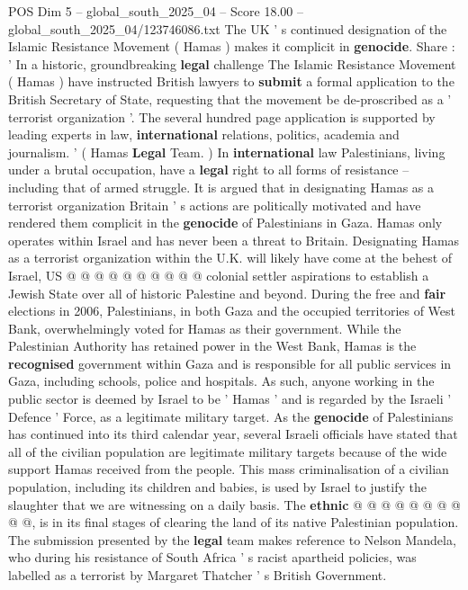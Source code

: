 \begin{textsample}{POS Dim 5 – global\_south\_2025\_04 – Score 18.00 – global\_south\_2025\_04/123746086.txt}  \label{ex:f5_pos_083}
The UK ' s continued designation of the Islamic Resistance Movement ( Hamas ) makes it complicit in \textbf{genocide}.
Share : ' In a historic, groundbreaking \textbf{legal} challenge The Islamic Resistance Movement ( Hamas ) have instructed British lawyers to \textbf{submit} a formal application to the British Secretary of State, requesting that the movement be de-proscribed as a ' terrorist organization '.
The several hundred page application is supported by leading experts in law, \textbf{international} relations, politics, academia and journalism. ' ( Hamas \textbf{Legal} Team. ) In \textbf{international} law Palestinians, living under a brutal occupation, have a \textbf{legal} right to all forms of resistance -- including that of armed struggle.
It is argued that in designating Hamas as a terrorist organization Britain ' s actions are politically motivated and have rendered them complicit in the \textbf{genocide} of Palestinians in Gaza.
Hamas only operates within Israel and has never been a threat to Britain.
Designating Hamas as a terrorist organization within the U.K. will likely have come at the behest of Israel, US @ @ @ @ @ @ @ @ @ @ colonial settler aspirations to establish a Jewish State over all of historic Palestine and beyond.
During the free and \textbf{fair} elections in 2006, Palestinians, in both Gaza and the occupied territories of West Bank, overwhelmingly voted for Hamas as their government.
While the Palestinian Authority has retained power in the West Bank, Hamas is the \textbf{recognised} government within Gaza and is responsible for all public services in Gaza, including schools, police and hospitals.
As such, anyone working in the public sector is deemed by Israel to be ' Hamas ' and is regarded by the Israeli ' Defence ' Force, as a legitimate military target.
As the \textbf{genocide} of Palestinians has continued into its third calendar year, several Israeli officials have stated that all of the civilian population are legitimate military targets because of the wide support Hamas received from the people.
This mass criminalisation of a civilian population, including its children and babies, is used by Israel to justify the slaughter that we are witnessing on a daily basis.
The \textbf{ethnic} @ @ @ @ @ @ @ @ @ @, is in its final stages of clearing the land of its native Palestinian population.
The submission presented by the \textbf{legal} team makes reference to Nelson Mandela, who during his resistance of South Africa ' s racist apartheid policies, was labelled as a terrorist by Margaret Thatcher ' s British Government.

\end{textsample}

